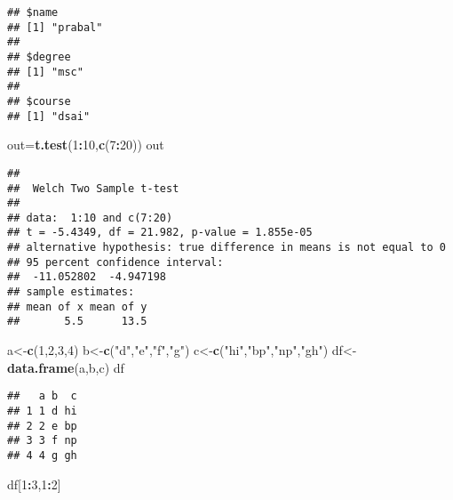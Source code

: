 \documentclass[
]{article}
\newenvironment{Shaded}{\begin{snugshade}}{\end{snugshade}}
\newcommand{\DecValTok}[1]{\textcolor[rgb]{0.00,0.00,0.81}{#1}}
\newcommand{\FunctionTok}[1]{\textcolor[rgb]{0.13,0.29,0.53}{\textbf{#1}}}
\newcommand{\NormalTok}[1]{#1}
\newcommand{\OtherTok}[1]{\textcolor[rgb]{0.56,0.35,0.01}{#1}}
\newcommand{\SpecialCharTok}[1]{\textcolor[rgb]{0.81,0.36,0.00}{\textbf{#1}}}
\newcommand{\StringTok}[1]{\textcolor[rgb]{0.31,0.60,0.02}{#1}}
\begin{document}
\begin{verbatim}
## $name
## [1] "prabal"
## 
## $degree
## [1] "msc"
## 
## $course
## [1] "dsai"
\end{verbatim}

\begin{Shaded}
\begin{Highlighting}[]
\NormalTok{out}\OtherTok{=}\FunctionTok{t.test}\NormalTok{(}\DecValTok{1}\SpecialCharTok{:}\DecValTok{10}\NormalTok{,}\FunctionTok{c}\NormalTok{(}\DecValTok{7}\SpecialCharTok{:}\DecValTok{20}\NormalTok{))}
\NormalTok{out}
\end{Highlighting}
\end{Shaded}

\begin{verbatim}
## 
##  Welch Two Sample t-test
## 
## data:  1:10 and c(7:20)
## t = -5.4349, df = 21.982, p-value = 1.855e-05
## alternative hypothesis: true difference in means is not equal to 0
## 95 percent confidence interval:
##  -11.052802  -4.947198
## sample estimates:
## mean of x mean of y 
##       5.5      13.5
\end{verbatim}

\begin{Shaded}
\begin{Highlighting}[]
\NormalTok{a}\OtherTok{\textless{}{-}}\FunctionTok{c}\NormalTok{(}\DecValTok{1}\NormalTok{,}\DecValTok{2}\NormalTok{,}\DecValTok{3}\NormalTok{,}\DecValTok{4}\NormalTok{)}
\NormalTok{b}\OtherTok{\textless{}{-}}\FunctionTok{c}\NormalTok{(}\StringTok{"d"}\NormalTok{,}\StringTok{"e"}\NormalTok{,}\StringTok{"f"}\NormalTok{,}\StringTok{"g"}\NormalTok{)}
\NormalTok{c}\OtherTok{\textless{}{-}}\FunctionTok{c}\NormalTok{(}\StringTok{"hi"}\NormalTok{,}\StringTok{"bp"}\NormalTok{,}\StringTok{"np"}\NormalTok{,}\StringTok{"gh"}\NormalTok{)}
\NormalTok{df}\OtherTok{\textless{}{-}}\FunctionTok{data.frame}\NormalTok{(a,b,c)}
\NormalTok{df}
\end{Highlighting}
\end{Shaded}

\begin{verbatim}
##   a b  c
## 1 1 d hi
## 2 2 e bp
## 3 3 f np
## 4 4 g gh
\end{verbatim}

\begin{Shaded}
\begin{Highlighting}[]
\NormalTok{df[}\DecValTok{1}\SpecialCharTok{:}\DecValTok{3}\NormalTok{,}\DecValTok{1}\SpecialCharTok{:}\DecValTok{2}\NormalTok{]}
\end{Highlighting}
\end{Shaded}
\end{document}
